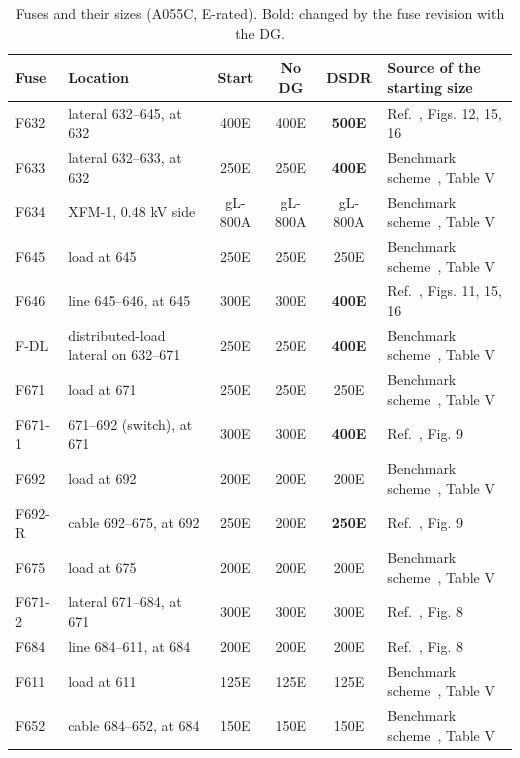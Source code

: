 \documentclass[12pt,a4paper]{article}
\begin{document}
\begin{table}[H]
\centering\footnotesize
\begin{tabularx}{\textwidth}{|l|l|c|c|c|L|}
\hline
\textbf{Fuse} & \textbf{Location} & \textbf{Start} & \textbf{No DG} & \textbf{DSDR} & \textbf{Source of the starting size} \\ \hline
F632 & lateral 632--645, at 632 & 400E & 400E & \textbf{500E} & Ref.~\cite{yousaf2022}, Figs. 12, 15, 16 \\ \hline
F633 & lateral 632--633, at 632 & 250E & 250E & \textbf{400E} & Benchmark scheme~\cite{yousaf2020}, Table V \\ \hline
F634 & XFM-1, 0.48 kV side & gL-800A & gL-800A & gL-800A & Benchmark scheme~\cite{yousaf2020}, Table V \\ \hline
F645 & load at 645 & 250E & 250E & 250E & Benchmark scheme~\cite{yousaf2020}, Table V \\ \hline
F646 & line 645--646, at 645 & 300E & 300E & \textbf{400E} & Ref.~\cite{yousaf2022}, Figs. 11, 15, 16 \\ \hline
F-DL & distributed-load lateral on 632--671 & 250E & 250E & \textbf{400E} & Benchmark scheme~\cite{yousaf2020}, Table V \\ \hline
F671 & load at 671 & 250E & 250E & 250E & Benchmark scheme~\cite{yousaf2020}, Table V \\ \hline
F671-1 & 671--692 (switch), at 671 & 300E & 300E & \textbf{400E} & Ref.~\cite{yousaf2022}, Fig. 9 \\ \hline
F692 & load at 692 & 200E & 200E & 200E & Benchmark scheme~\cite{yousaf2020}, Table V \\ \hline
F692-R & cable 692--675, at 692 & 250E & 200E & \textbf{250E} & Ref.~\cite{yousaf2022}, Fig. 9 \\ \hline
F675 & load at 675 & 200E & 200E & 200E & Benchmark scheme~\cite{yousaf2020}, Table V \\ \hline
F671-2 & lateral 671--684, at 671 & 300E & 300E & 300E & Ref.~\cite{yousaf2022}, Fig. 8 \\ \hline
F684 & line 684--611, at 684 & 200E & 200E & 200E & Ref.~\cite{yousaf2022}, Fig. 8 \\ \hline
F611 & load at 611 & 125E & 125E & 125E & Benchmark scheme~\cite{yousaf2020}, Table V \\ \hline
F652 & cable 684--652, at 684 & 150E & 150E & 150E & Benchmark scheme~\cite{yousaf2020}, Table V \\ \hline
\end{tabularx}
\caption{Fuses and their sizes (A055C, E-rated). Bold: changed by the fuse revision with the DG.}
\label{tab:fuses}
\end{table}
\end{document}
